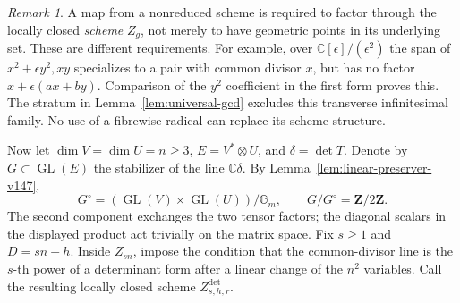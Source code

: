 \documentclass[11pt,reqno]{amsart}
\numberwithin{equation}{section}
\theoremstyle{definition}\newtheorem{definition}[theorem]{Definition}
\theoremstyle{remark}\newtheorem{remark}[theorem]{Remark}
\newcommand{\C}{\mathbb C}\newcommand{\Q}{\mathbb Q}
\begin{document}
\begin{remark}\label{rem:gcd-scheme-condition}
A map from a nonreduced scheme is required to factor through the
locally closed \emph{scheme} \(Z_g\), not merely to have geometric
points in its underlying set.  These are different requirements.
For example, over \(\C[\epsilon]/(\epsilon^2)\) the span of
\(x^2+\epsilon y^2,xy\) specializes to a pair with common divisor
\(x\), but has no factor \(x+\epsilon(ax+by)\).  Comparison of the
\(y^2\) coefficient in the first form proves this.  The stratum in
Lemma~\ref{lem:universal-gcd} excludes this transverse infinitesimal
family.  No use of a fibrewise radical can replace its scheme structure.
\end{remark}

Now let \(\dim V=\dim U=n\ge3\),
\(E=V^*\otimes U\), and \(\delta=\det T\).  Denote by
\(G\subset\operatorname{GL}(E)\) the stabilizer of the line
\(\C\delta\).  By Lemma~\ref{lem:linear-preserver-v147},
\begin{equation}\label{eq:determinant-group}
 G^\circ=(\operatorname{GL}(V)\times\operatorname{GL}(U))/\mathbb G_m,
                 \qquad G/G^\circ=\mathbf Z/2\mathbf Z.
\end{equation}
The second component exchanges the two tensor factors; the diagonal
scalars in the displayed product act trivially on the matrix space.
Fix \(s\ge1\) and \(D=sn+h\).  Inside \(Z_{sn}\), impose the condition
that the common-divisor line is the \(s\)-th power of a determinant
form after a linear change of the \(n^2\) variables.  Call the resulting
locally closed scheme \(Z^{\det}_{s,h,r}\).
\end{document}
